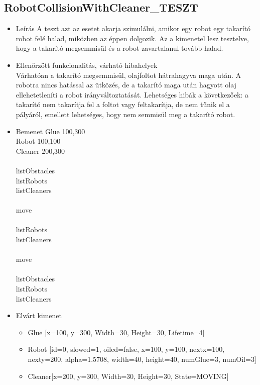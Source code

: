 \subsection{RobotCollisionWithCleaner\_TESZT}
\begin{itemize}
\item Leírás\newline
A teszt azt az esetet akarja szimulálni, amikor egy robot egy takarító robot felé halad, miközben az éppen dolgozik. Az a kimenetel lesz tesztelve, hogy a takarító megsemmisül és a robot zavartalanul tovább halad.
\item Ellenőrzött funkcionalitás, várható hibahelyek\\
Várhatóan a takarító megsemmisül, olajfoltot hátrahagyva maga után. A robotra nincs hatással az ütközés, de a takarító maga után hagyott olaj ellehetetleníti a robot irányváltoztatását. Lehetséges hibák a következőek: a takarító nem takarítja fel a foltot vagy feltakarítja, de nem tűnik el a pályáról, emellett lehetséges, hogy nem semmisül meg a takarító robot.
\item Bemenet\newline
Glue 100,300\\
Robot 100,100\\
Cleaner 200,300\\
\\
listObstacles\\
listRobots\\
listCleaners\\
\\
move\\
\\
listRobots\\
listCleaners\\
\\	
move\\
\\	
listObstacles\\
listRobots\\
listCleaners\\
\item Elvárt kimenet\newline
\begin{itemize}
\item Glue [x=100, y=300, Width=30, Height=30, Lifetime=4]
\item Robot [id=0, slowed=1, oiled=false, x=100, y=100, nextx=100, nexty=200, alpha=1.5708, width=40, height=40, numGlue=3, numOil=3]
\item Cleaner[x=200, y=300, Width=30, Height=30, State=MOVING]

\end{itemize}
\end{itemize}
